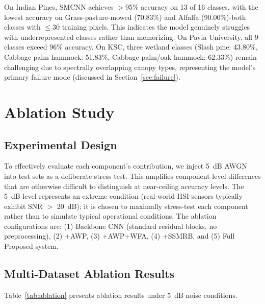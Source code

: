 \documentclass[conference]{IEEEtran}
\begin{document}
On Indian Pines, SMCNN achieves $>$95\% accuracy on 13 of 16 classes, with the lowest accuracy on Grass-pasture-mowed (70.83\%) and Alfalfa (90.00\%)-both classes with $\leq$30 training pixels. This indicates the model genuinely struggles with underrepresented classes rather than memorizing. On Pavia University, all 9 classes exceed 96\% accuracy. On KSC, three wetland classes (Slash pine: 43.80\%, Cabbage palm hammock: 51.83\%, Cabbage palm/oak hammock: 62.33\%) remain challenging due to spectrally overlapping canopy types, representing the model's primary failure mode (discussed in Section~\ref{sec:failure}).

\section{Ablation Study}

\subsection{Experimental Design}

To effectively evaluate each component's contribution, we inject 5~dB AWGN into test sets as a deliberate stress test. This amplifies component-level differences that are otherwise difficult to distinguish at near-ceiling accuracy levels. The 5~dB level represents an extreme condition (real-world HSI sensors typically exhibit SNR $>$ 20~dB); it is chosen to maximally stress-test each component rather than to simulate typical operational conditions. The ablation configurations are: (1) Backbone CNN (standard residual blocks, no preprocessing), (2) +AWP, (3) +AWP+WFA, (4) +SSMRB, and (5) Full Proposed system.

\subsection{Multi-Dataset Ablation Results}

Table~\ref{tab:ablation} presents ablation results under 5~dB noise conditions.
\end{document}
